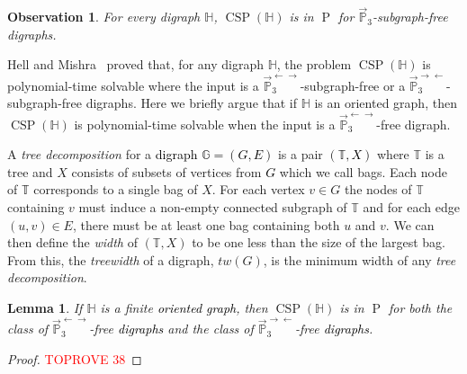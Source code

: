 \documentclass{article}
\newtheorem{lemma}[theorem]{Lemma}
\newtheorem{observation}[theorem]{Observation}
\theoremstyle{definition}
\theoremstyle{remark}
\newcommand{\blue}[1]{\textcolor{black}{#1}}
\DeclareMathOperator{\cP}{P}
\DeclareMathOperator{\CSP}{CSP}
\newcommand{\bG}{{\mathbb G}}
\newcommand{\bH}{{\mathbb H}}
\newcommand{\bP}{{\mathbb P}}
\newcommand{\bT}{{\mathbb T}}
\begin{document}
\begin{observation}\label{obs:general-P3}
    For every digraph $\bH$, $\CSP(\bH)$ is in $\cP$ for $\vec{\bP}_3$-subgraph-free
    digraphs. 
\end{observation}

Hell and Mishra~\cite{HM14} proved that, for any digraph $\bH$, the problem $\CSP(\bH)$ is polynomial-time
solvable where the input is a $\vec{\bP}_3^{\leftarrow\rightarrow}$-subgraph-free or a
$\vec{\bP}_3^{\rightarrow\leftarrow}$-subgraph-free digraphs. 
Here we briefly argue that if $\bH$ is an oriented graph, then $\CSP(\bH)$ is polynomial-time
solvable when the input is a $\vec{\bP}_3^{\leftarrow\rightarrow}$-free digraph. 

A \textit{tree decomposition} for a \blue{digraph} \blue{$\bG=(G,E)$} is a pair \blue{$(\bT,X)$} where $\bT$ is a tree
and $X$ consists of subsets of vertices from \blue{$G$} which we call bags. Each node of \blue{$\bT$} corresponds to a single
bag of $X$. For each vertex $v \in G$ the nodes of $\bT$ containing $v$ must induce a non-empty connected subgraph of
$\bT$ and for each edge $(u,v) \in E$, there must be at least one bag containing both $u$ and $v$. We can then define the \textit{width} of $(\bT,X)$ to be one less than the size of the largest bag. From this, the \textit{treewidth} of a digraph, $\mathit{tw}(G)$, is the minimum width of any \textit{tree decomposition}.


\begin{lemma}
    If $\bH$ is a finite \blue{oriented graph}, then  $\CSP(\bH)$ is in $\cP$ for both the class of $\vec{\bP}_3^{\leftarrow\rightarrow}$-free \blue{digraphs} and the class of
    $\vec{\bP}_3^{\rightarrow\leftarrow}$-free \blue{digraphs}.
    \label{lem:martin-milanic}
\end{lemma}
\begin{proof}\textcolor{red}{TOPROVE 38}\end{proof}
\end{document}
